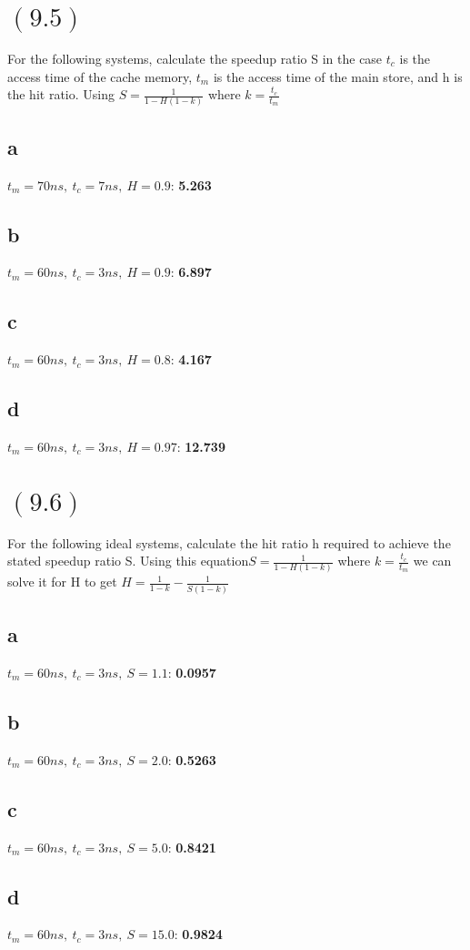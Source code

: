 \documentclass[letterpaper,12pt,titlepage]{article}
\begin{document}
\newpage
\section*{$(9.5)$} For the following systems, calculate the speedup ratio S in the case $t_c$ is the access time of the cache memory, $t_m$ is the access time of the main store, and h is the hit ratio. Using $S=\frac{1}{1-H(1-k)}$ where $k=\frac{t_c}{t_m}$
\begin{mdframed}[style=MyFrame]
\subsection*{a} $t_m=70ns,~t_c=7ns,~H=0.9$: \textbf{5.263}
\subsection*{b} $t_m=60ns,~t_c=3ns,~H=0.9$: \textbf{6.897}
\subsection*{c} $t_m=60ns,~t_c=3ns,~H=0.8$: \textbf{4.167}
\subsection*{d} $t_m=60ns,~t_c=3ns,~H=0.97$: \textbf{12.739}
\end{mdframed}

\section*{$(9.6)$} For the following ideal systems, calculate the hit ratio h required to achieve the stated speedup ratio S. Using this equation$S=\frac{1}{1-H(1-k)}$ where $k=\frac{t_c}{t_m}$ we can solve it for H to get $H=\frac{1}{1-k}-\frac{1}{S(1-k)}$
\begin{mdframed}[style=MyFrame]
\subsection*{a} $t_m=60ns,~t_c=3ns,~S=1.1$: \textbf{0.0957}
\subsection*{b} $t_m=60ns,~t_c=3ns,~S=2.0$: \textbf{0.5263}
\subsection*{c} $t_m=60ns,~t_c=3ns,~S=5.0$: \textbf{0.8421}
\subsection*{d} $t_m=60ns,~t_c=3ns,~S=15.0$: \textbf{0.9824}
\end{mdframed}
\newpage
\end{document}

